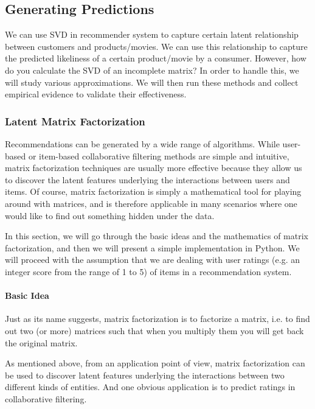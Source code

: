   \subsection{Generating Predictions}
  We can use SVD in recommender system to capture certain latent relationship between customers and products/movies. We can use this relationship to capture the predicted likeliness of a certain product/movie by a consumer. However, how do you calculate the SVD of an incomplete matrix? In order to handle this, we will study various approximations. We will then run these methods and collect empirical evidence to validate their effectiveness.
  \subsubsection{Latent Matrix Factorization}

Recommendations can be generated by a wide range of algorithms. While user-based or item-based collaborative filtering methods are simple and intuitive, matrix factorization techniques are usually more effective because they allow us to discover the latent features underlying the interactions between users and items. Of course, matrix factorization is simply a mathematical tool for playing around with matrices, and is therefore applicable in many scenarios where one would like to find out something hidden under the data.

In this section, we will go through the basic ideas and the mathematics of matrix factorization, and then we will present a simple implementation in Python. We will proceed with the assumption that we are dealing with user ratings (e.g. an integer score from the range of 1 to 5) of items in a recommendation system.
\paragraph{Basic Idea}
Just as its name suggests, matrix factorization is to factorize a matrix, i.e. to find out two (or more) matrices such that when you multiply them you will get back the original matrix.

As mentioned above, from an application point of view, matrix factorization can be used to discover latent features underlying the interactions between two different kinds of entities. And one obvious application is to predict ratings in collaborative filtering.

